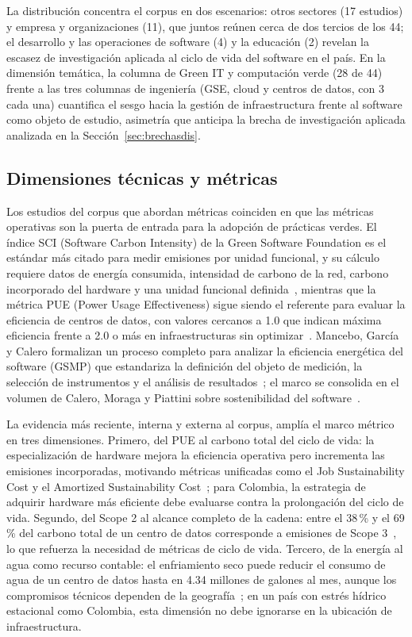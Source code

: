 \documentclass[conference]{IEEEtran}
\begin{document}
La distribuci\'on concentra el corpus en dos escenarios: otros sectores (17 estudios) y empresa y organizaciones (11), que juntos re\'unen cerca de dos tercios de los 44; el desarrollo y las operaciones de software (4) y la educaci\'on (2) revelan la escasez de investigaci\'on aplicada al ciclo de vida del software en el pa\'is. En la dimensi\'on tem\'atica, la columna de Green IT y computaci\'on verde (28 de 44) frente a las tres columnas de ingenier\'ia (GSE, cloud y centros de datos, con 3 cada una) cuantifica el sesgo hacia la gesti\'on de infraestructura frente al software como objeto de estudio, asimetr\'ia que anticipa la brecha de investigaci\'on aplicada analizada en la Secci\'on~\ref{sec:brechasdis}.

\subsection{Dimensiones t\'ecnicas y m\'etricas}\label{sec:tecnicas}
Los estudios del corpus que abordan m\'etricas coinciden en que las m\'etricas operativas son la puerta de entrada para la adopci\'on de pr\'acticas verdes. El \'indice SCI (Software Carbon Intensity) de la Green Software Foundation es el est\'andar m\'as citado para medir emisiones por unidad funcional, y su c\'alculo requiere datos de energ\'ia consumida, intensidad de carbono de la red, carbono incorporado del hardware y una unidad funcional definida~\cite{fontanarrosa2024,jin2025}, mientras que la m\'etrica PUE (Power Usage Effectiveness) sigue siendo el referente para evaluar la eficiencia de centros de datos, con valores cercanos a 1.0 que indican m\'axima eficiencia frente a 2.0 o m\'as en infraestructuras sin optimizar~\cite{harmon2009,diaz2017}. Mancebo, Garc\'ia y Calero formalizan un proceso completo para analizar la eficiencia energ\'etica del software (GSMP) que estandariza la definici\'on del objeto de medici\'on, la selecci\'on de instrumentos y el an\'alisis de resultados~\cite{mancebo2021calero}; el marco se consolida en el volumen de Calero, Moraga y Piattini sobre sostenibilidad del software~\cite{calero2021book}.

La evidencia m\'as reciente, interna y externa al corpus, ampl\'ia el marco m\'etrico en tres dimensiones. Primero, del PUE al carbono total del ciclo de vida: la especializaci\'on de hardware mejora la eficiencia operativa pero incrementa las emisiones incorporadas, motivando m\'etricas unificadas como el Job Sustainability Cost y el Amortized Sustainability Cost~\cite{eilam2024}; para Colombia, la estrategia de adquirir hardware m\'as eficiente debe evaluarse contra la prolongaci\'on del ciclo de vida. Segundo, del Scope 2 al alcance completo de la cadena: entre el 38\,\% y el 69\,\% del carbono total de un centro de datos corresponde a emisiones de Scope 3~\cite{lin2023}, lo que refuerza la necesidad de m\'etricas de ciclo de vida. Tercero, de la energ\'ia al agua como recurso contable: el enfriamiento seco puede reducir el consumo de agua de un centro de datos hasta en 4.34 millones de galones al mes, aunque los compromisos t\'ecnicos dependen de la geograf\'ia~\cite{gnibga2024}; en un pa\'is con estr\'es h\'idrico estacional como Colombia, esta dimensi\'on no debe ignorarse en la ubicaci\'on de infraestructura.
\end{document}
